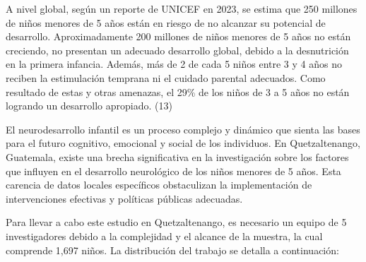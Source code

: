 \documentclass[11pt,letterpaper]{report}
\begin{document}
A nivel global, según un reporte de UNICEF en 2023, se estima que 250 millones
de niños menores de 5 años están en riesgo de no alcanzar su potencial de
desarrollo. Aproximadamente 200 millones de niños menores de 5 años no están
creciendo, no presentan un adecuado desarrollo global, debido a la desnutrición
en la primera infancia. Además, más de 2 de cada 5 niños entre 3 y 4 años no
reciben la estimulación temprana ni el cuidado parental adecuados. Como
resultado de estas y otras amenazas, el 29\% de los niños de 3 a 5 años no
están logrando un desarrollo apropiado. (13)

El neurodesarrollo infantil es un proceso complejo y dinámico que sienta las
bases para el futuro cognitivo, emocional y social de los individuos. En
Quetzaltenango, Guatemala, existe una brecha significativa en la investigación
sobre los factores que influyen en el desarrollo neurológico de los niños
menores de 5 años. Esta carencia de datos locales específicos obstaculizan la
implementación de intervenciones efectivas y políticas públicas adecuadas.

Para llevar a cabo este estudio en Quetzaltenango, es necesario un equipo de 5
investigadores debido a la complejidad y el alcance de la muestra, la cual
comprende 1,697 niños. La distribución del trabajo se detalla a continuación:
\end{document}
